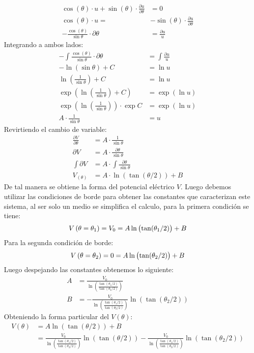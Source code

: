 \documentclass[
  11pt,
  letterpaper,
   answers
  ]{exam}
\begin{document}
\begin{questions}
\begin{solution}
\begin{parts}
\begin{align}
\cos{(\theta)}\cdot u+ \sin{(\theta)}\cdot \frac{\partial u}{\partial \theta} &=0\\
\cos{(\theta)}\cdot u =&- \sin{(\theta)}\cdot \frac{\partial u}{\partial \theta} \\
-\frac{\cos{(\theta)}}{\sin{\theta}}\cdot \partial \theta &= \frac{\partial u}{u}
\end{align}
Integrando a ambos lados:
\begin{align}
    -\int\frac{\cos{(\theta)}}{\sin{\theta}}\cdot \partial \theta &= \int\frac{\partial u}{u} \\
    -\ln{(\sin{\theta})} +C &= \ln{u} \\
    \ln{(\frac{1}{\sin{\theta}})}+C &= \ln{u} \\
    \exp{(\ln{(\frac{1}{\sin{\theta}})}+C)} &= \exp{(\ln{u})} \\
    \exp{(\ln{(\frac{1}{\sin{\theta}})})}\cdot\exp{C} &= \exp{(\ln{u})}\\
    A \cdot \frac{1}{\sin{\theta}} &= u
\end{align}
Revirtiendo el cambio de variable:
\begin{align}
    \frac{\partial V}{\partial \theta} &= A \cdot \frac{1}{\sin{\theta}} \\
    \partial V &= A \cdot \frac{\partial \theta}{\sin{ \theta}} \\
    \int \partial V &= A \cdot \int \frac{\partial \theta}{\sin{ \theta}} \\
    V_{(\theta)}&= A\cdot \ln{(\tan(\theta /2))} + B
\end{align}
De tal manera se obtiene la forma del potencial eléctrico $V$. Luego debemos utilizar las condiciones de borde para obtener las constantes que caracterizan este sistema, al ser solo un medio se simplifica el calculo, para la primera condición se tiene:
\begin{align}
  V\del{\theta = \theta_{1}} = V_{0} = A \ln\del{\tan(\theta_{1}/2)} + B
\end{align}
Para la segunda condición de borde:
\begin{align}
  V\del{\theta = \theta_{2}} = 0 = A\ln\del{\tan(\theta_{2}/2)} + B
\end{align}
Luego despejando las constantes obtenemos lo siguiente:
\begin{align}
  A &= \frac{V_{0}}{\ln\left(\frac{\tan(\theta_{1}/2)}{\tan(\theta_{2}/2)}\right)}\\
  B &=  -\frac{V_{0}}{\ln\left(\frac{\tan(\theta_{1}/2)}{\tan(\theta_{2}/2)}\right)} \ln(\tan(\theta_{2}/2))
\end{align}
Obteniendo la forma particular del $V(\theta)$:
\begin{align}
  V(\theta) &= A \ln(\tan(\theta/2)) + B\\
  &=\frac{V_{0}}{\ln\left(\frac{\tan(\theta_{1}/2)}{\tan(\theta_{2}/2)}\right)} \ln(\tan(\theta/2)) -\frac{V_{0}}{\ln\left(\frac{\tan(\theta_{1}/2)}{\tan(\theta_{2}/2)}\right)} \ln(\tan(\theta_{2}/2))
\end{align}


\end{parts}
\end{solution}
\end{questions}
\end{document}
